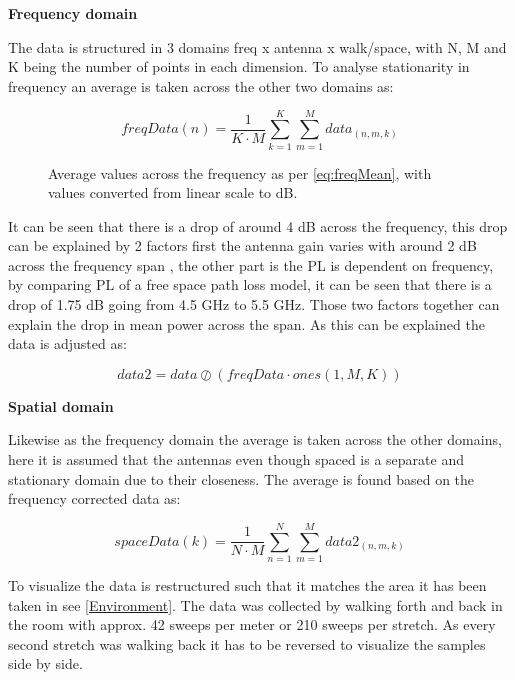 \textbf{Frequency domain}

The data is structured in 3 domains freq x antenna x walk/space, with N, M and K being the number of points in each dimension. To analyse stationarity in frequency an average is taken across the other two domains as:

\begin{equation}\label{eq:freqMean}
freqData(n) = \frac{1}{K\cdot M}\sum_{k = 1}^{K}\sum_{m = 1}^{M} data_{(n,m,k)}
\end{equation}

\begin{figure}[H]
\centering

\caption{Average values across the frequency as per \autoref{eq:freqMean}, with values converted from linear scale to dB.}
\label{fig:meanFading}
\end{figure}

It can be seen that there is a drop of around 4 dB across the frequency, this drop can be explained by 2 factors first the antenna gain varies with around 2 dB across the frequency span , the other part is the \gls{PL} is dependent on frequency, by comparing PL of a free space path loss model, it can be seen that there is a drop of 1.75 dB going from 4.5 GHz to 5.5 GHz. Those two factors together can explain the drop in mean power across the span. As this can be explained the data is adjusted as:

\begin{equation}
data2 =  data \oslash \left(freqData\cdot ones(1,M,K)\right)
\end{equation}

\textbf{Spatial domain}

Likewise as the frequency domain the average is taken across the other domains, here it is assumed that the antennas even though spaced is a separate and stationary domain due to their closeness. The average is found based on the frequency corrected data as:

\begin{equation}\label{eq:spaceMean}
spaceData(k) = \frac{1}{N\cdot M}\sum_{n = 1}^{N}\sum_{m = 1}^{M} data2_{(n,m,k)}
\end{equation}

To visualize the data is restructured such that it matches the area it has been taken in see \autoref{Environment}. The data was collected by walking forth and back in the room with approx. 42 sweeps per meter or 210 sweeps per stretch. As every second stretch was walking back it has to be reversed to visualize the samples side by side. 



